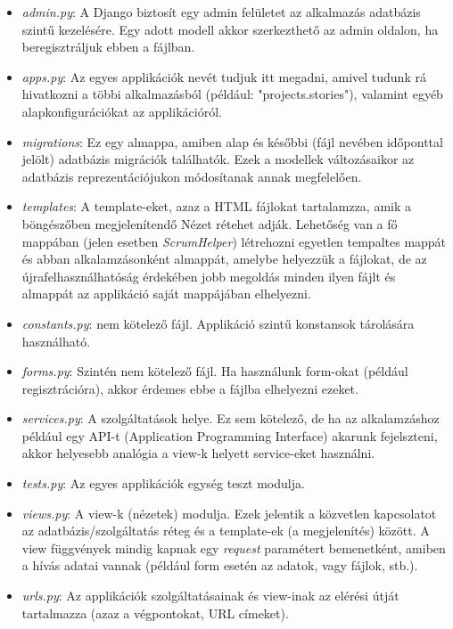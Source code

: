 \begin{itemize}
	\item \textit{admin.py}: A Django biztosít egy admin felületet az alkalmazás adatbázis szintű kezelésére. Egy adott modell akkor szerkezthető az admin oldalon, ha beregisztráljuk ebben a fájlban.
	\item \textit{apps.py}: Az egyes applikációk nevét tudjuk itt megadni, amivel tudunk rá hivatkozni a többi alkalmazásból (például: "projects.stories"), valamint egyéb alapkonfigurációkat az applikációról.
	\item \textit{migrations}: Ez egy almappa, amiben alap és későbbi (fájl nevében időponttal jelölt) adatbázis migrációk találhatók. Ezek a modellek változásaikor az adatbázis reprezentációjukon módosítanak annak megfelelően.
	\item \textit{templates}: A template-eket, azaz a HTML fájlokat tartalamzza, amik a böngészőben megjelenítendő Nézet rétehet adják. Lehetőség van a fő mappában (jelen esetben \textit{ScrumHelper}) létrehozni egyetlen tempaltes mappát és abban alkalamzásonként almappát, amelybe helyezzük a fájlokat,   de az újrafelhasználhatóság érdekében jobb megoldás minden ilyen fájlt és almappát az applikáció saját mappájában elhelyezni.
	\item \textit{constants.py}: nem kötelező fájl. Applikáció szintű konstansok tárolására használható.
	\item \textit{forms.py}: Szintén nem kötelező fájl. Ha használunk form-okat (például regisztrációra), akkor érdemes ebbe a fájlba elhelyezni ezeket.
	\item \textit{services.py}: A szolgáltatások helye. Ez sem kötelező, de ha az alkalamzáshoz például egy API-t (Application Programming Interface) akarunk fejelszteni, akkor helyesebb analógia a view-k helyett service-eket használni.
	\item \textit{tests.py}: Az egyes applikációk egység teszt modulja.
	\item \textit{views.py}: A view-k (nézetek) modulja. Ezek jelentik a közvetlen kapcsolatot az adatbázis/szolgáltatás réteg és a template-ek (a megjelenítés) között. A view függvények mindig kapnak egy \textit{request} paramétert bemenetként, amiben a hívás adatai vannak (például form esetén az adatok, vagy fájlok, stb.).
	\item \textit{urls.py}: Az applikációk szolgáltatásainak és view-inak az elérési útját tartalmazza (azaz a végpontokat, URL címeket).
\end{itemize}

